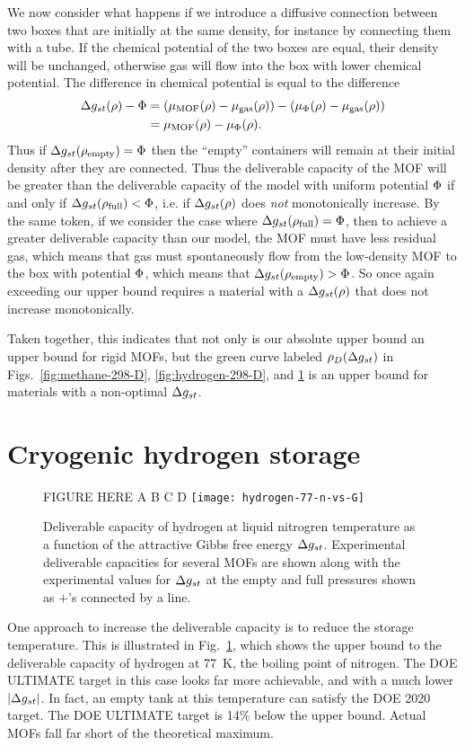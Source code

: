 We now consider what happens if we introduce a diffusive connection between two boxes that are initially at the same density, for instance by connecting them with a tube.  If the chemical potential of the two boxes are equal, their density will be unchanged, otherwise gas will flow into the box with lower chemical potential.  The difference in chemical potential is equal to the difference
\begin{align}
   \Delta g_{st}(\rho) - \Phi &= \left(\mu_{\text{MOF}}(\rho) - \mu_{\text{gas}}(\rho)\right)
   - \left(\mu_{\Phi}(\rho) - \mu_{\text{gas}}(\rho)\right)
   \\
   &= \mu_{\text{MOF}}(\rho) - \mu_{\Phi}(\rho).
\end{align}
Thus if $\Delta g_{st}(\rho_{\text{empty}}) = \Phi$ then the ``empty'' containers will remain at their initial density after they are connected.  Thus the deliverable capacity of the MOF will be greater than the deliverable capacity of the model with uniform potential $\Phi$ if and only if $\Delta g_{st}(\rho_{\text{full}})<\Phi$, i.e. if $\Delta g_{st}(\rho)$ does \emph{not} monotonically increase.  By the same token, if we consider the case where $\Delta g_{st}(\rho_{\text{full}}) = \Phi$, then to achieve a greater deliverable capacity than our model, the MOF must have less residual gas, which means that gas must spontaneously flow from the low-density MOF to the box with potential $\Phi$, which means that $\Delta g_{st}(\rho_{\text{empty}})>\Phi$.  So once again exceeding our upper bound requires a material with a $\Delta g_{st}(\rho)$ that does not increase monotonically.

Taken together, this indicates that not only is our absolute upper bound an upper bound for rigid MOFs, but the green curve labeled $\rho_D(\Delta g_{st})$ in Figs.~\ref{fig:methane-298-D}, \ref{fig:hydrogen-298-D}, and \ref{fig:hydrogen-77-D} is an upper bound for materials with a non-optimal $\Delta g_{st}$.

\section{Cryogenic hydrogen storage}\label{sec:cryo-hydrogen}
\begin{figure}
    \centering
    FIGURE HERE A B C D
    \texttt{[image: hydrogen-77-n-vs-G]}
    \caption{Deliverable capacity of hydrogen at liquid nitrogren temperature as a function of the attractive Gibbs free energy $\Delta g_{st}$. Experimental deliverable capacities for several MOFs are shown along with the experimental values for $\Delta g_{st}$ at the empty and full pressures shown as $+$'s connected by a line.}
    \label{fig:hydrogen-77-D}
\end{figure}

One approach to increase the deliverable capacity is to reduce the storage temperature. This is illustrated in Fig.~\ref{fig:hydrogen-77-D}, which shows the upper bound to the deliverable capacity of hydrogen at 77\ K, the boiling point of nitrogen. The DOE ULTIMATE target in this case looks far more achievable, and with a much lower $|\Delta g_{st}|$. In fact, an empty tank at this temperature can satisfy the DOE 2020 target. The DOE ULTIMATE target is 14\% below the upper bound. Actual MOFs fall far short of the theoretical maximum.
